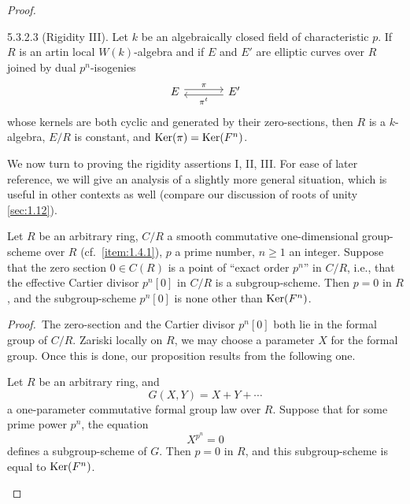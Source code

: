 \begin{proof}
\begin{pitemnum}{5.3.2.3}\label{lem:5.3.2.3}
(Rigidity III). Let $k$ be an algebraically closed field of characteristic $p$. If $R$ is an artin local $W(k)$-algebra and if $E$ and $E'$ are elliptic curves over $R$ joined by dual $p^n$-isogenies
\[
\begin{tikzcd}[row sep=small, column sep=large]
E \arrow[r, shift left, "\pi"] & E' \arrow[l, shift left, "\pi^t"]
\end{tikzcd}
\]
whose kernels are both cyclic and generated by their zero-sections, then $R$ is a $k$-algebra, $E/R$ is constant, and $\operatorname{Ker}(\pi) = \operatorname{Ker}(F^n)$.
\end{pitemnum}

We now turn to proving the rigidity assertions I, II, III. For ease of later reference, we will give an analysis of a slightly more general situation, which is useful in other contexts as well (compare our discussion of roots of unity \ref{sec:1.12}).

\begin{kprop}\label{prop:5.3.3}
Let $R$ be an arbitrary ring, $C/R$ a smooth commutative one-dimensional group-scheme over $R$ (cf.\ \ref{item:1.4.1}), $p$ a prime number, $n \ge 1$ an integer. Suppose that the zero section $0 \in C(R)$ is a point of ``exact order $p^n$'' in $C/R$, i.e., that the effective Cartier divisor $p^n[0]$ in $C/R$ is a subgroup-scheme. Then $p = 0$ in $R$, and the subgroup-scheme $p^n[0]$ is none other than $\operatorname{Ker}(F^n)$.
\end{kprop}

\medskip
\noindent\emph{Proof.}\ The zero-section and the Cartier divisor $p^n[0]$ both lie in the formal group of $C/R$. Zariski locally on $R$, we may choose a parameter $X$ for the formal group. Once this is done, our proposition results from the following one.

\begin{kprop}\label{prop:5.3.4}
Let $R$ be an arbitrary ring, and
\[
G(X, Y) = X + Y + \cdots
\]
a one-parameter commutative formal group law over $R$. Suppose that for some prime power $p^n$, the equation
\[
X^{p^n} = 0
\]
defines a subgroup-scheme of $G$. Then $p = 0$ in $R$, and this subgroup-scheme is equal to $\operatorname{Ker}(F^n)$.
\end{kprop}


\end{proof}
